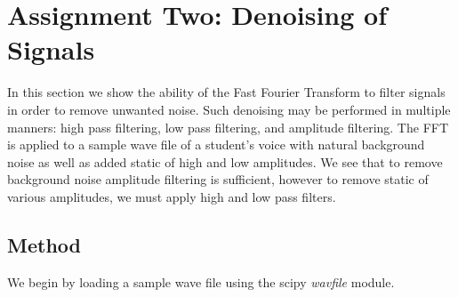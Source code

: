 
\section{Assignment Two: Denoising of Signals} %
\label{sec:assignment_two_denoising_of_signals}

In this section we show the ability of the Fast Fourier Transform to filter signals in order to remove unwanted noise. Such denoising may be performed in multiple manners: high pass filtering, low pass filtering, and amplitude filtering. The FFT is applied to a sample wave file of a student's voice with natural background noise as well as added static of high and low amplitudes. We see that to remove background noise amplitude filtering is sufficient, however to remove static of various amplitudes, we must apply high and low pass filters.

\subsection{Method} %
\label{sub:method}
We begin by loading a sample wave file using the scipy \emph{wavfile} module.

